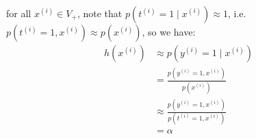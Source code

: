 \begin{answer}

    for all $x^{(i)}\in V_{+}$, note that $p(t^{(i)} = 1\mid x^{(i)})\approx 1$, i.e. $p(t^{(i)} = 1, x^{(i)})\approx p(x^{(i)})$, so we have:
    $$
    \begin{aligned}
        h(x^{(i)}) &\approx p(y^{(i)}=1 \mid x^{(i)}) \\
        &= \frac{p(y^{(i)}=1, x^{(i)})}{p(x^{(i)})}\\
        &\approx \frac{p(y^{(i)}=1, x^{(i)})}{p(t^{(i)} = 1, x^{(i)})} \\
        &= \alpha 
    \end{aligned}
    $$
\end{answer}
